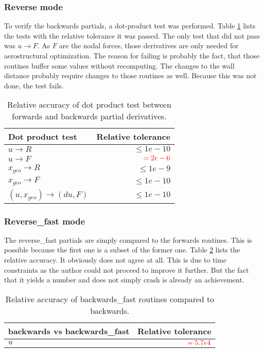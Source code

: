 \subsubsection{Reverse mode}
To verify the backwards partials, a dot-product test was performed. Table
\ref{tab:partials_dotproduct_test} lists the tests  with the relative tolerance
it was passed. The only test that did not pass was $u \rightarrow F$. As $F$
are the nodal forces, those derivatives are only needed for aerostructural
optimization. The reason for failing is probably the fact, that those routines
buffer some values without recomputing. The changes to the wall distance
probably require changes to those routines as well. Because this was not done,
the test fails.

\begin{table}[H]
    \centering
    \begin{tabular}{l r}
        \toprule
        Dot product test                     & Relative tolerance \\
        \toprule
        $u \rightarrow R$                   & $\leq 1e-10$ \\
        $u \rightarrow F$                   & $\textcolor{red}{= 2e-6}$ \\
        \midrule
        $x_{geo} \rightarrow R$             & $\leq 1e-9$ \\
        $x_{geo} \rightarrow F$             & $\leq 1e-10$ \\
        \midrule
        $(u, x_{geo}) \rightarrow (du, F)$  & $\leq 1e-10$ \\
        \bottomrule
    \end{tabular}
    \caption{Relative accuracy of dot product test between forwards and
    backwards partial derivatives.}
    \label{tab:partials_dotproduct_test}
\end{table}


\subsubsection{Reverse\_fast mode}
The reverse\_fast partials are simply compared to the forwards routines. This
is possible because the first one is a subset of the former one. Table
\ref{tab:partials_fast} lists the relative accuracy. It obviously does not
agree at all. This is due to time constraints as the author could not proceed
to improve it further. But the fact that it yields a number and does not simply
crash is already an achievement.

\begin{table}[H]
    \centering
    \begin{tabular}{l r}
        \toprule
        backwards vs backwards\_fast        & Relative tolerance \\
        \toprule
        $u$                                 & $\textcolor{red}{= 5.7e4}$ \\
        \bottomrule
    \end{tabular}
    \caption{Relative accuracy of backwards\_fast routines compared to
    backwards.}
    \label{tab:partials_fast}
\end{table}







